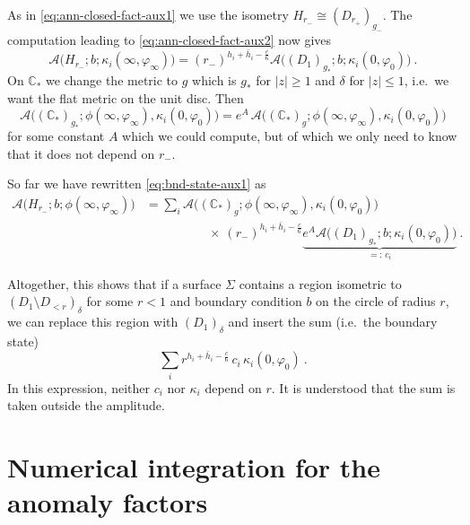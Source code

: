 \documentclass[11pt,a4paper]{article}
\numberwithin{equation}{section}
\begin{document}
As in \eqref{eq:ann-closed-fact-aux1} we use the isometry $H_{r_-} \cong (D_{r_+})_{g_-}$. The computation leading to \eqref{eq:ann-closed-fact-aux2} now gives
\begin{equation}
    \mathcal{A}\big(H_{r_-};b;\kappa_i(\infty,\varphi_\infty)
    \big) 
    = (r_-)^{h_i+\bar h_i-\frac{c}{6}}
    \mathcal{A}\big((D_{1})_{g_*};b;\kappa_i(0,\varphi_0)
    \big)
    \ .
\end{equation}
On $\mathbb{C}_*$ we change the metric to $g$ which is $g_*$ for $|z| \ge 1$ and $\delta$ for $|z| \le 1$, i.e.\ we want the flat metric on the unit disc. Then 
\begin{equation}
\mathcal{A}\big((\mathbb{C}_*)_{g_*};\phi(\infty,\varphi_\infty),\kappa_i(0,\varphi_0)
    \big)
= e^A\,   
\mathcal{A}\big((\mathbb{C}_*)_{g};\phi(\infty,\varphi_\infty),\kappa_i(0,\varphi_0)
    \big)
\end{equation}
for some constant $A$ which we could compute, but of which we only need to know that it does not depend on $r_-$.

So far we have rewritten \eqref{eq:bnd-state-aux1} as
\begin{align}
\mathcal{A}\big(H_{r_-};b;\phi(\infty,\varphi_\infty)\big) 
&= 
\sum_i 
\mathcal{A}\big((\mathbb{C}_*)_{g};\phi(\infty,\varphi_\infty),\kappa_i(0,\varphi_0)
    \big)
    \nonumber\\
&    \hspace{5em}
\times ~
(r_-)^{h_i+\bar h_i-\frac{c}{6}}
\underbrace{e^A \mathcal{A}\big((D_{1})_{g_*};b;\kappa_i(0,\varphi_0)
    \big)}_{=: \, c_i} 
\ .
\end{align}

Altogether, 
this shows that if a surface $\Sigma$ contains a region isometric to $(D_1 \setminus D_{<r})_\delta$ for some $r<1$ and boundary condition $b$ on the circle of radius $r$, we can replace this region with $(D_1)_\delta$ and insert the sum (i.e.\ the boundary state)
\begin{equation}
    \sum_i r^{h_i+\bar h_i-\frac{c}{6}} \, c_i \, \kappa_i(0,\varphi_0) \ .
\end{equation}
In this expression, neither $c_i$ nor $\kappa_i$ depend on $r$. It is understood that the sum is taken outside the amplitude.

\section{Numerical integration for the anomaly factors}
\label{app:numerics}
\end{document}
